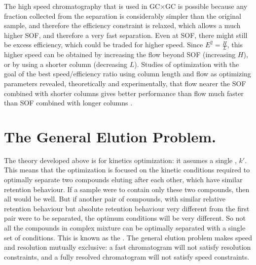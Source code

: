 The high speed chromatography that is used in GC×GC is possible because any
fraction collected from the \oneD separation is considerably simpler than the
original sample, and therefore the efficiency constraint is relaxed, which
allows a much higher SOF, and therefore a very fast \twoD separation. Even at
SOF, there might still be excess efficiency, which could be traded for higher
speed. Since \(E^2 = \frac{H}{L} \), this higher speed can be obtained by
increasing the flow beyond SOF (increasing \(H\)), or by using a shorter column
(decreasing \(L\)). Studies of optimization with the goal of the best
speed/efficiency ratio using column length and flow as optimizing parameters
revealed, theoretically and experimentally, that flow nearer the SOF combined
with shorter columns gives better performance than flow much faster than SOF
combined with longer columns \autocite{Klee2002, Reed1999}.

\section{The General Elution Problem.}

The theory developed above is for kinetics optimization: it assumes a single
, \(k'\). This means that the optimization is focused
on the kinetic conditions required to optimally separate two compounds eluting
after each other, which have similar retention behaviour. If a sample were to
contain only these two compounds, then all would be well. But if another pair of
compounds, with similar relative retention behaviour but absolute retention behaviour
very different from the first pair were to be separated, the optimum conditions
will be very different. So not all the compounds in complex mixture can be
optimally separated with a single set of conditions. This is known as the
 \autocite[p. 779]{Skoog2007}. The general
elution problem makes speed and resolution mutually exclusive: a fast
chromatogram will not satisfy resolution constraints, and a fully resolved
chromatogram will not satisfy speed constraints.

